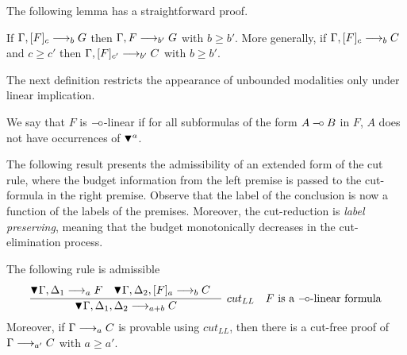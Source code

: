 The following lemma has a straightforward proof.
\begin{lemma}
If $\Gamma, [F]_c \longrightarrow_{b}G$ then 
$\Gamma, F \longrightarrow_{b'}G$
with $b \geq b'$. More generally,  if $\Gamma, [F]_c \longrightarrow_{b}C$ and $c \geq c'$ then
$\Gamma, [F]_{c'} \longrightarrow_{b'}C$ with $b \geq b'$. 
\end{lemma}
The next definition restricts the appearance of unbounded modalities 
only under linear implication.
\begin{definition}
We say that $F$ is  $\mathbin{-\hspace{-0.70mm}\circ}$-linear if for all subformulas of the form $A \mathbin{-\hspace{-0.70mm}\circ} B$ in $F$, $A$ does not have occurrences 
of $\blacktriangledown^{a}$. 
\end{definition}
The following result presents the admissibility of an extended form of the cut rule, where the budget information from the left premise is passed to the cut-formula in the right premise. Observe that the label
of the conclusion is now a function of the labels of the premises. Moreover, the cut-reduction is {\em label preserving}, meaning that the budget monotonically decreases in the cut-elimination process.
\begin{theorem}
The following rule is admissible
\[
\infer[cut_{LL}\mbox{\quad $F$ is a $\limp$-linear formula}]{\pnbang{}\Gamma,\Delta_1,\Delta_2 \lraS{a + b} C}{
 \deduce{\pnbang{}\Gamma,\Delta_1 \lraS{a}F}{}&
 \deduce{\pnbang{}\Gamma,\Delta_2, [F]_a \lraS{b}C}{}&
}
\]
Moreover, if $\Gamma \longrightarrow_{a} C$ is provable using $cut_{LL}$, then there is a cut-free proof of 
$\Gamma \longrightarrow_{a'}C$ with $a\geq a'$.

\end{theorem}
